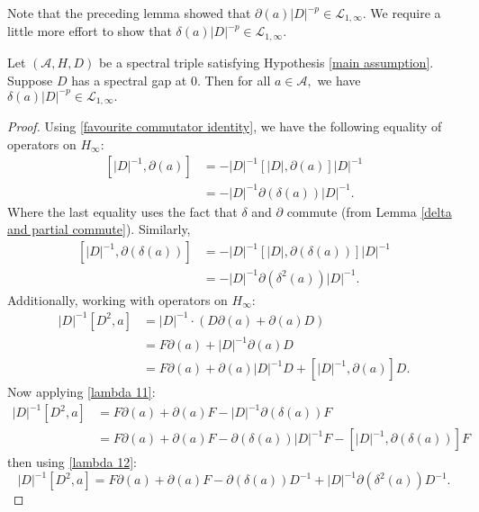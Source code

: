     Note that the preceding lemma showed that $\partial(a)|D|^{-p} \in \mathcal{L}_{1,\infty}$. We require a little more effort to show that $\delta(a)|D|^{-p} \in \mathcal{L}_{1,\infty}$.
    \begin{lem}\label{lambda lemma} 
        Let $(\mathcal{A},H,D)$ be a spectral triple satisfying Hypothesis \ref{main assumption}. Suppose $D$ has a spectral gap at $0.$ Then for all $a\in\mathcal{A},$ we have $\delta(a)|D|^{-p}\in\mathcal{L}_{1,\infty}.$
    \end{lem}
    \begin{proof} 
        Using \eqref{favourite commutator identity}, we have the following equality of operators on $H_\infty$:
        \begin{align}\label{lambda 11}
            [|D|^{-1},\partial(a)] &= -|D|^{-1}[|D|,\partial(a)]|D|^{-1}\nonumber\\
                                   &= -|D|^{-1}\partial(\delta(a))|D|^{-1}.
        \end{align}
        Where the last equality uses the fact that $\delta$ and $\partial$ commute (from Lemma \ref{delta and partial commute}). Similarly,
        \begin{align}\label{lambda 12}
            [|D|^{-1},\partial(\delta(a))] &= -|D|^{-1}[|D|,\partial(\delta(a))]|D|^{-1} \nonumber\\
                                           &= -|D|^{-1}\partial(\delta^2(a))|D|^{-1}.
        \end{align}
        Additionally, working with operators on $H_\infty$:
        \begin{align*}
            |D|^{-1}[D^2,a] &= |D|^{-1}\cdot(D\partial(a)+\partial(a)D)\\
                            &= F\partial(a)+|D|^{-1}\partial(a)D\\
                            &= F\partial(a)+\partial(a)|D|^{-1}D+[|D|^{-1},\partial(a)]D.
        \end{align*}
        Now applying \eqref{lambda 11}:    
        \begin{align*}
            |D|^{-1}[D^2,a] &= F\partial(a)+\partial(a)F-|D|^{-1}\partial(\delta(a))F\\
                            &= F\partial(a)+\partial(a)F-\partial(\delta(a))|D|^{-1}F-[|D|^{-1},\partial(\delta(a))]F
        \end{align*}
        then using \eqref{lambda 12}:
        \begin{equation*}
            |D|^{-1}[D^2,a] = F\partial(a)+\partial(a)F-\partial(\delta(a))D^{-1}+|D|^{-1}\partial(\delta^2(a))D^{-1}.

\end{equation*}
\end{proof}
